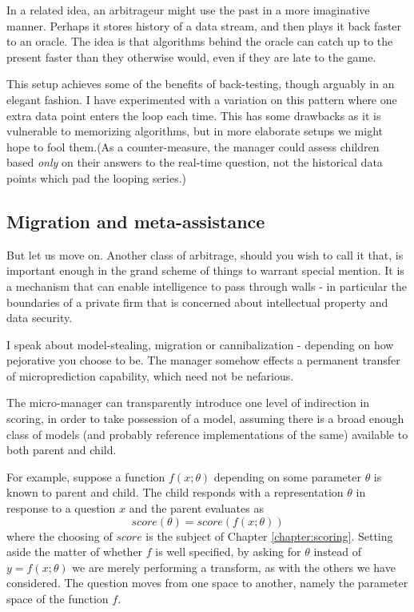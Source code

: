 In a related idea, an arbitrageur might use the past in a more imaginative manner. Perhaps it stores history of a data stream, and then plays it back faster to an oracle. The idea is that algorithms behind the oracle can catch up to the present faster than they otherwise would, even if they are late to the game. 

This setup achieves some of the benefits of back-testing, though arguably in an elegant fashion. I have experimented with a variation on this pattern where one extra data point enters the loop each time. This has some drawbacks as it is vulnerable to memorizing algorithms, but in more elaborate setups we might hope to fool them.(As a counter-measure, the manager could assess children based {\em only} on their answers to the real-time question, not the historical data points which pad the looping series.)

\subsection{Migration and meta-assistance}


But let us move on. Another class of arbitrage, should you wish to call it that, is important enough in the grand scheme of things to warrant special mention. It is a mechanism that can enable intelligence to pass through walls - in particular the boundaries of a private firm that is concerned about intellectual property and data security. 

I speak about model-stealing, migration or cannibalization - depending on how pejorative you choose to be. The manager somehow effects a permanent transfer of microprediction capability, which need not be nefarious. 

The micro-manager can transparently introduce one level of indirection in scoring, in order to take possession of a model, assuming there is a broad enough class of models (and probably reference implementations of the same) available to both parent and child. 

For example, suppose a function $f(x;\theta)$ depending on some parameter $\theta$ is known to parent and child. The child responds with a representation $\theta$ in response to a question $x$ and the parent evaluates as 
$$
     score(\theta) = score( f(x;\theta) )
$$
where the choosing of $score$ is the subject of Chapter \ref{chapter:scoring}. Setting aside the matter of whether $f$ is well specified, by asking for $\theta$ instead of $y=f(x;\theta)$ we are merely performing a transform, as with the others we have considered. The question moves from one space to another, namely the parameter space of the function $f$. 

